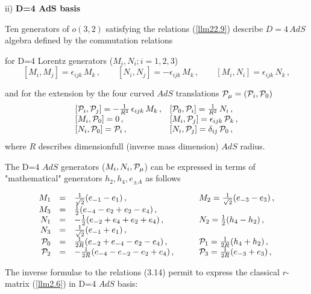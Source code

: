 \documentclass[a4paper,12pt,showkeys]{article}
\begin{document}
ii) {\bf D=4 AdS basis}

Ten generators of $o(3,2)$ satisfying the
relations (\ref{llm22.9})  describe $D=4 \, AdS$ algebra defined by the
commutation relations

for D=4  Lorentz generators ($M_i , N_i; i=1,2,3 $)
\begin{equation}\label{llm3.12}
  [M_i , M_j ] = \epsilon_{ijk} \, M_k \, , \qquad
  [ N_i , N_j ] = -\epsilon_{ijk} \, M_k \, , \qquad
  [M_i , N_i ] = \epsilon_{ijk} \, N_k \, ,
\end{equation}

and for the extension by the four curved $AdS$ translations
${\cal P}_\mu = ({\cal P}_i , {\cal P}_0 )$
\begin{equation}\label{llm3.13}
\begin{array}{ll}
 [{\cal P}_i , {\cal P}_j ] = - \frac{1}{R^2} \, \epsilon_{ijk}\, M_k\, ,
& [{\cal P}_0 , {\cal P}_i ] =  \frac{1}{R^2} \, N_i\, ,
 \cr [M_i
, {\cal P}_0 ] = 0 \, , &[{M}_i , {\cal P}_j ] = \epsilon_{ijk}\,
{\cal P}_k\, ,
\cr [N_i ,{\cal  P}_0 ] =  {\cal P}_i \, , &[N_i , {\cal
P}_j] = \delta_{ij} \,   {\cal P}_0 \, ,
\end{array}
\end{equation}
where $R$ describes dimensionfull  (inverse mass dimension)
 $AdS$ radius.



  The D=4 $AdS$
generators ($M_i, N_i , {\cal P}_\mu $)
can be expressed in terms of "mathematical" generators $h_2, h_4, e_{\pm A}$
as follows


\begin{equation}\label{lulymo3.14}
\begin{array}{rlll}
M_1 &=&  \frac{1}{\sqrt{2}}(e_{-1} - e_1) \, , \qquad
&
 M_2 = \frac{1}{\sqrt{2}}(e_{-3} - e_3) \, ,
\cr
M_3 &=&   \frac{1}{{2}}(e_{-4} - e_2 + e_2 - e_4) \, ,
&
\cr
N_1 &=& - \frac{1}{{2}}(e_{-2} + e_4 + e_2 + e_4) \, ,
\qquad
&
N_2 =  \frac{1}{{2}}(h_{4} - h_2) \, ,
\cr
N_3 &=&  \frac{1}{\sqrt{2}}(e_{-1} + e_1) \, ,
&
\cr
{\cal P}_0 &=&  \frac{1}{{2R}}(e_{-2} + e_{-4} - e_2 - e_4) \, ,
\qquad
&
{\cal P}_1 = \frac{1}{{2R}}(h_{4} + h_{2} ) \, ,
\cr
{\cal P}_2 &=&  -\frac{1}{{2R}}(e_{-4} - e_{-2} - e_2 + e_4) \, ,
\qquad
&
{\cal P}_3 = \frac{1}{{2R}}(e_{-3} + e_{3} ) \, ,
\end{array}
\end{equation}

The inverse formulae to the relations (3.14) permit
 to express
 the classical $r$-matrix (\ref{llm2.6}) in D=4 $AdS$
   basis:
\end{document}
